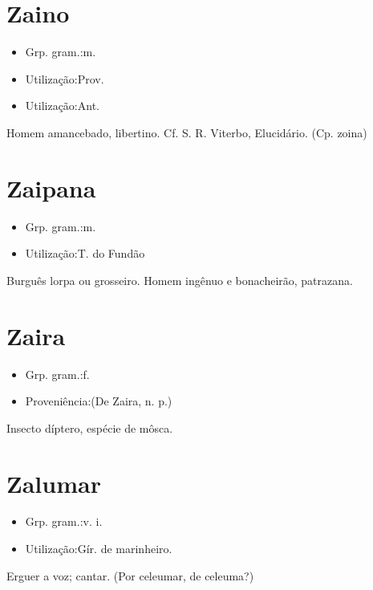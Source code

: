 \section{Zaino}
\begin{itemize}
\item {Grp. gram.:m.}
\end{itemize}
\begin{itemize}
\item {Utilização:Prov.}
\end{itemize}
\begin{itemize}
\item {Utilização:Ant.}
\end{itemize}
Homem amancebado, libertino. Cf. S. R. Viterbo, \textunderscore Elucidário\textunderscore .
(Cp. \textunderscore zoina\textunderscore )
\section{Zaipana}
\begin{itemize}
\item {Grp. gram.:m.}
\end{itemize}
\begin{itemize}
\item {Utilização:T. do Fundão}
\end{itemize}
Burguês lorpa ou grosseiro.
Homem ingênuo e bonacheirão, patrazana.
\section{Zaira}
\begin{itemize}
\item {Grp. gram.:f.}
\end{itemize}
\begin{itemize}
\item {Proveniência:(De \textunderscore Zaira\textunderscore , n. p.)}
\end{itemize}
Insecto díptero, espécie de môsca.
\section{Zalumar}
\begin{itemize}
\item {Grp. gram.:v. i.}
\end{itemize}
\begin{itemize}
\item {Utilização:Gír. de marinheiro.}
\end{itemize}
Erguer a voz; cantar.
(Por \textunderscore celeumar\textunderscore , de \textunderscore celeuma\textunderscore ?)
